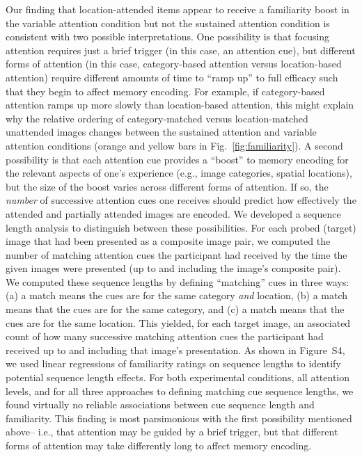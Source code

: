 \documentclass[english]{article}
\newcommand{\sequenceLength}{S4}
\begin{document}
Our finding that location-attended items appear to receive a familiarity boost
in the variable attention condition but not the sustained attention condition
is consistent with two possible interpretations. One possibility is that
focusing attention requires just a brief trigger (in this case, an attention
cue), but different forms of attention (in this case, category-based attention
versus location-based attention) require different amounts of time to ``ramp
up'' to full efficacy such that they begin to affect memory encoding. For
example, if category-based attention ramps up more slowly than location-based
attention, this might explain why the relative ordering of category-matched
versus location-matched unattended images changes between the sustained
attention and variable attention conditions (orange and yellow bars in
Fig.~\ref{fig:familiarity}). A second possibility is that each attention cue
provides a ``boost'' to memory encoding for the relevant aspects of one's
experience (e.g., image categories, spatial locations), but the size of the
boost varies across different forms of attention. If so, the \textit{number} of
successive attention cues one receives should predict how effectively the
attended and partially attended images are encoded. We developed a sequence
length analysis to distinguish between these possibilities. For each probed
(target) image that had been presented as a composite image pair, we computed
the number of matching attention cues the participant had received by the time
the given images were presented (up to and including the image's composite
pair). We computed these sequence lengths by defining ``matching'' cues in
three ways: (a) a match means the cues are for the same category \textit{and}
location, (b) a match means that the cues are for the same category, and (c) a
match means that the cues are for the same location. This yielded, for each
target image, an associated count of how many successive matching attention
cues the participant had received up to and including that image's
presentation. As shown in Figure~\sequenceLength, we used linear regressions of
familiarity ratings on sequence lengths to identify potential sequence length
effects. For both experimental conditions, all attention levels, and for all
three approaches to defining matching cue sequence lengths, we found virtually
no reliable associations between cue sequence length and familiarity. This
finding is most parsimonious with the first possibility mentioned above-- i.e.,
that attention may be guided by a brief trigger, but that different forms of
attention may take differently long to affect memory encoding.
\end{document}
